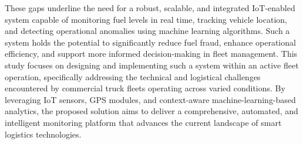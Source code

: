 These gaps underline the need for a robust, scalable, and integrated IoT-enabled system capable of monitoring fuel levels in real time, tracking vehicle location, and detecting operational anomalies using machine learning algorithms. Such a system holds the potential to significantly reduce fuel fraud, enhance operational efficiency, and support more informed decision-making in \gls{fleet management}. This study focuses on designing and implementing such a system within an active fleet operation, specifically addressing the technical and logistical challenges encountered by commercial truck fleets operating across varied conditions. By leveraging IoT sensors, GPS modules, and context-aware machine-learning-based analytics, the proposed solution aims to deliver a comprehensive, automated, and intelligent monitoring platform that advances the current landscape of smart logistics technologies.



